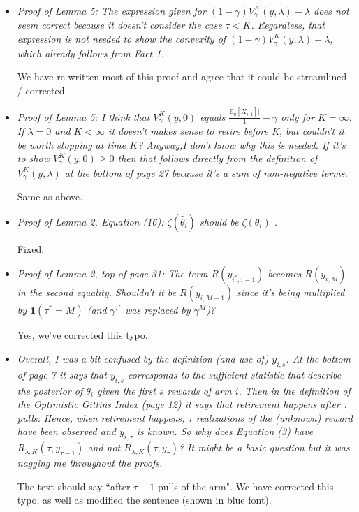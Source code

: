 \documentclass[11pt]{article}
\newcommand{\1}{\ensuremath{\mathbf{1}}} %
\theoremstyle{thm-sf}
\begin{document}
\begin{enumerate}
\begin{itemize}
			 \item {\it Proof of Lemma 5: The expression given for $(1 - \gamma) V_\gamma^K (y, \lambda) - \lambda$ does not seem correct because it doesn't consider the case $\tau < K$. Regardless, that expression is not needed to show the convexity of $(1 - \gamma) V_\gamma^K (y, \lambda) - \lambda$, which already follows from Fact 1.}
			 
			 We have re-written most of this proof and agree that it could be streamlined / corrected.
			 
			 \item {\it Proof of Lemma 5: I think that $V^{K}_\gamma(y, 0)$ equals $\frac{\mathbb E_y[X_{i,1}]|}1-\gamma$ only for $K = \infty$. If $\lambda = 0$ and $K < \infty$ it doesn't makes sense to retire before K, but couldn't it be worth stopping at time $K$? Anyway,I don't know why this is needed. If it's to show $V^{K}_\gamma(y, 0) \geq 0$ then that follows directly from the definition of $V^{K}_\gamma(y, \lambda)$ at the bottom of page 27 because it's a sum of non-negative terms.}
			 
			 Same as above.
			 
			 \item {\it Proof of Lemma 2, Equation (16): $\zeta(\hat \theta_i)$ should be $\zeta(\theta_i)$ .}
			 
			 Fixed.
			 
			 \item {\it 
			 	Proof of Lemma 2, top of page 31: The term  $R(y_{i^*, \tau - 1})$ becomes $R(y_{i,M})$ in the second equality. Shouldn't it be $R(y_{i,M-1})$ since it's being multiplied by $\mathbf 1(\tau^* = M)$ (and $\gamma^{\tau^*}$ was replaced by $\gamma^M$)?
			 }
			 
			 Yes, we've corrected this typo.
		 
		 	\item {\it Overall, I was a bit confused by the definition (and use of) $y_{i,s}$. At the bottom of page 7 it says that $y_{i,s}$ corresponds to the sufficient statistic that describe the posterior of $\theta_i$ given the first $s$ rewards of arm $i$. Then in the definition of the Optimistic Gittins Index (page 12) it says that retirement happens after $\tau$ pulls. Hence, when retirement happens, $\tau$ realizations of the (unknown) reward have been observed and $y_{i,\tau}$ is known. 
		 		So why does Equation (3) have $R_{\lambda,K}(\tau, y_{\tau-1})$ and not $R_{\lambda,K}(\tau, y_{\tau})$? It might be a basic question but it was nagging me throughout the proofs.
	 		}
	 		
	 		The text should say ``after $\tau -1$ pulls of the arm". We have corrected this typo, as well as modified the sentence (shown in blue font).
			 
			 
		\end{itemize}
	
	\end{enumerate}
\end{document}
